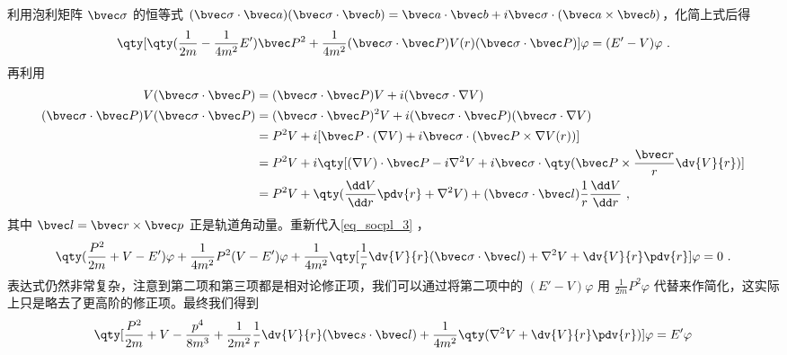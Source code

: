 利用泡利矩阵 $\bvec \sigma$ 的恒等式  $(\bvec \sigma\cdot \bvec a)(\bvec \sigma\cdot \bvec b)=\bvec a\cdot \bvec b+i\bvec \sigma\cdot (\bvec a\times \bvec b)$，化简上式后得
\begin{equation}\label{eq_socpl_3}
\qty[\qty(\frac{1}{2m}-\frac{1}{4m^2}E')\bvec P^2+\frac{1}{4m^2}(\bvec \sigma\cdot \bvec P)V(r)(\bvec \sigma\cdot \bvec P)]\varphi=(E'-V)\varphi~.
\end{equation}
再利用
\begin{equation}
\begin{aligned}
V(\bvec \sigma\cdot \bvec P)&=(\bvec \sigma\cdot \bvec P)V+i (\bvec \sigma\cdot \nabla V)\\
(\bvec \sigma\cdot \bvec P)V(\bvec \sigma\cdot \bvec P)&=(\bvec \sigma\cdot \bvec P)^2 V+i (\bvec \sigma\cdot \bvec P)(\bvec \sigma\cdot \nabla V)\\
&=P^2 V+i [\bvec P\cdot (\nabla V)+i\bvec \sigma \cdot (\bvec P\times \nabla V(r))]\\
&=P^2V+i\qty[(\nabla V)\cdot \bvec P-i\nabla^2 V+i\bvec \sigma\cdot\qty(\bvec P\times \frac{\bvec r}{r}\dv{V}{r})]\\
&=P^2V+\qty(\frac{\dd V}{\dd r}\pdv{r} + \nabla^2 V)+(\bvec \sigma\cdot \bvec l)\frac{1}{r}\frac{\dd V}{\dd r}~,
\end{aligned}
\end{equation}
其中 $\bvec l=\bvec r\times \bvec p$ 正是轨道角动量。重新代入\autoref{eq_socpl_3} ，
\begin{equation}
\qty(\frac{P^2}{2m}+V-E')\varphi+\frac{1}{4m^2}P^2(V-E')\varphi + \frac{1}{4m^2}\qty[\frac{1}{r}\dv{V}{r}(\bvec \sigma\cdot\bvec l)+\nabla^2 V+\dv{V}{r}\pdv{r}]\varphi = 0~.
\end{equation}
表达式仍然非常复杂，注意到第二项和第三项都是相对论修正项，我们可以通过将第二项中的 $(E'-V)\varphi$ 用 $\frac{1}{2m}P^2\varphi$ 代替来作简化，这实际上只是略去了更高阶的修正项。最终我们得到
\begin{equation}
\qty[\frac{P^2}{2m}+V-\frac{p^4}{8m^3}+\frac{1}{2m^2}\frac{1}{r}\dv{V}{r}(\bvec s\cdot \bvec l)+\frac{1}{4m^2}\qty(\nabla^2 V+\dv{V}{r}\pdv{r})]\varphi = E'\varphi
\end{equation}

